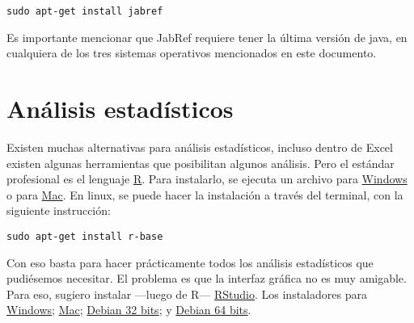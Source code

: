 \documentclass[letterpaper,12pt]{article}
\begin{document}
\begin{verbatim}
sudo apt-get install jabref
\end{verbatim}

	Es importante mencionar que JabRef requiere tener la última versión de java, en cualquiera de los tres sistemas operativos mencionados en este documento.

\section*{Análisis estadísticos}
Existen muchas alternativas para análisis estadísticos, incluso dentro de Excel existen algunas herramientas que posibilitan algunos análisis. Pero el estándar profesional es el lenguaje \href{https://www.r-project.org/}{R}. Para instalarlo, se ejecuta un archivo para \href{http://dirichlet.mat.puc.cl/bin/windows/base/R-3.2.1-win.exe}{Windows} o para \href{http://dirichlet.mat.puc.cl/bin/macosx/R-3.2.1.pkg}{Mac}. En linux, se puede hacer la instalación a través del terminal, con la siguiente instrucción:

\begin{verbatim}
sudo apt-get install r-base
\end{verbatim}

	Con eso basta para hacer prácticamente todos los análisis estadísticos que pudiésemos necesitar. El problema es que la interfaz gráfica no es muy amigable. Para eso, sugiero instalar ---luego de R--- \href{https://www.rstudio.com/}{RStudio}. Los instaladores para \href{https://download1.rstudio.org/RStudio-0.99.467.exe}{Windows}; \href{https://download1.rstudio.org/RStudio-0.99.467.dmg}{Mac}; \href{https://download1.rstudio.org/rstudio-0.99.467-i386.deb}{Debian 32 bits}; y \href{https://download1.rstudio.org/rstudio-0.99.467-amd64.deb}{Debian 64 bits}.
\end{document}
